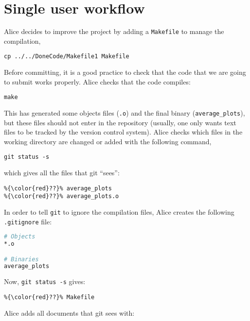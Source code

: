 \documentclass[a4paper,10pt]{article}
\begin{document}
\clearpage

\section{Single user workflow}
Alice decides to improve the project by adding a \texttt{Makefile} to manage the compilation,

\begin{lstlisting}[style=AliceFake]
 cp ../../DoneCode/Makefile1 Makefile
\end{lstlisting}

Before committing, it is a good practice to check that the code that we are going to submit works properly. Alice checks that the code compiles:

\begin{lstlisting}[style=AliceFake]
 make
\end{lstlisting}

This has generated some objects files (\texttt{.o}) and the final binary (\texttt{average\_plots}), but these files should not enter in the repository (usually, one only wants text files to be tracked by the version control system). Alice checks which files in the working directory are changed or added with the following command,

\begin{lstlisting}[style=Alice]
 git status -s
\end{lstlisting}
which gives all the files that git ``sees'':

\begin{lstlisting}[style=Output]
%{\color{red}??}% Makefile
%{\color{red}??}% average_plots
%{\color{red}??}% average_plots.o
\end{lstlisting}

In order to tell \texttt{git} to ignore the compilation files, Alice creates the following \texttt{.gitignore} file:

\begin{lstlisting}[style=Text,language=bash,commentstyle=\color{blue}]
# Objects
*.o

# Binaries
average_plots
\end{lstlisting}

Now, \texttt{git status -s} gives:

\begin{lstlisting}[style=Output]
%{\color{red}??}% .gitignore
%{\color{red}??}% Makefile
\end{lstlisting}

Alice adds all documents that git sees with:
\end{document}
